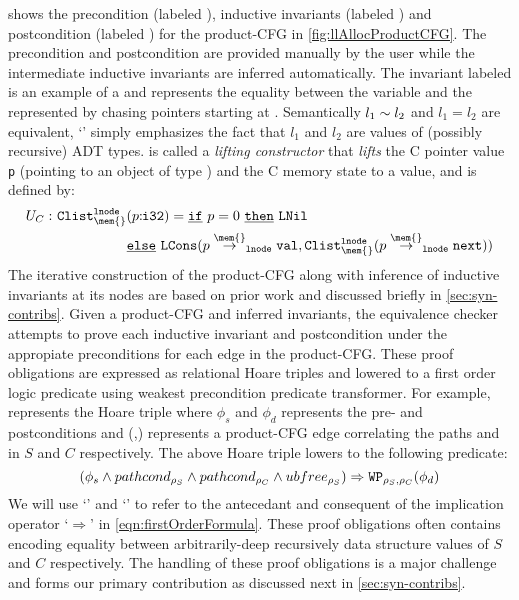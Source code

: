  shows the precondition (labeled ),
inductive invariants (labeled ) and postcondition (labeled )
for the product-CFG in \cref{fig:llAllocProductCFG}. The precondition and postcondition are
provided manually by the user while the intermediate inductive invariants are inferred automatically.
The invariant labeled  is an example of a \recursiveRelation{} and represents
the equality between the \SpecL{}  variable  and the  represented by
chasing  pointers starting at .
Semantically $l_1\sim{}l_2$ and $l_1=l_2$ are equivalent, `\indEq{}' simply emphasizes the
fact that $l_1$ and $l_2$ are values of (possibly recursive) ADT types.
 is called a {\em lifting constructor} that {\em lifts}
the C pointer value {\tt p} (pointing to an object of type ) and the C
memory state \mem{} to a \SpecL{}  value, and is defined by:
\begin{equation}
\label{eqn:clist}
\begin{split}
U_C:\ &\lifted{list}{\mem{}}{lnode}{p\ctype{i32}} = \sumIf{p=0} \ \sumThen{\cons{LNil}} \\ & \qquad\qquad\ \ \  \sumElse{\cons{LCons}(\structPointer{p}{\mem{}}{lnode}{val}, \lifted{list}{\mem{}}{lnode}{\structPointer{p}{\mem{}}{lnode}{next}})}
\end{split}
\end{equation}
The iterative construction of the product-CFG along with inference of inductive invariants at its nodes are based on
prior work \cite{oopsla20} and discussed briefly in \cref{sec:syn-contribs}. Given a product-CFG
and inferred invariants, the equivalence checker attempts to prove each inductive invariant and
postcondition under the appropiate preconditions for each edge in the product-CFG. These proof
obligations are expressed as relational Hoare triples \cite{relationalHoareLogic,hoareTriple}
and lowered to a first order logic predicate using weakest precondition predicate transformer.
For example, 
represents the Hoare triple where $\phi_s$ and $\phi_d$ represents the pre- and postconditions
and (\sv{\rho},\cv{\rho}) represents a product-CFG edge correlating the paths \sv{\rho} and \cv{\rho}
in $S$ and $C$ respectively. The above Hoare triple lowers to the following predicate:
\begin{equation}
\label{eqn:firstOrderFormula}
(\phi_s \land pathcond_{{\tt \rho}_{S}} \land pathcond_{{\tt \rho}_{C}} \land ubfree_{{\tt \rho}_{S}}) \Rightarrow {\tt WP}_{{{\tt \rho}_{S},{\tt \rho}_{C}}}(\phi_d)
\end{equation}
We will use `\lhs{}' and `\rhs{}' to refer to the antecedant and consequent of the
implication operator `$\Rightarrow$' in \cref{eqn:firstOrderFormula}.
These proof obligations often contains \recursiveRelations{} encoding equality between
arbitrarily-deep recursively data structure values of $S$ and $C$ respectively.
The handling of these proof obligations is a major challenge and forms our primary
contribution as discussed next in \cref{sec:syn-contribs}.
\vspace{-5px}
